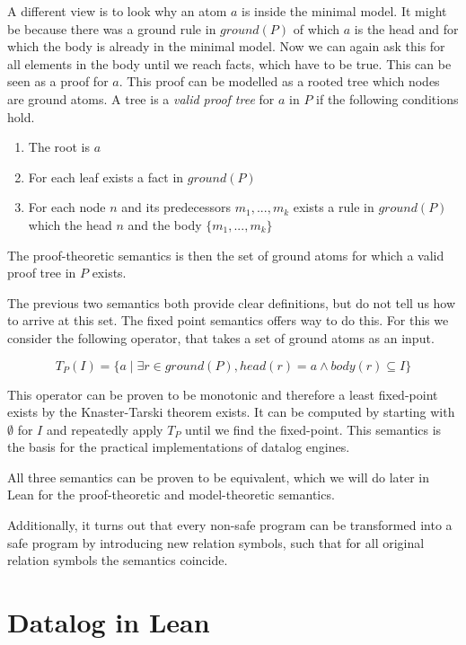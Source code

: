 \documentclass{article}
\begin{document}
        A different view is to look why an atom $a$ is inside the minimal model. It might be because there was a ground rule in $ground(P)$ of which $a$ is the head and for which the body is already in the minimal model. Now we can again ask this for all elements in the body until we reach facts, which have to be true. This can be seen as a proof for $a$. This proof can be modelled as a rooted tree which nodes are ground atoms. A tree is a \textit{valid proof tree} for $a$ in $P$ if the following conditions hold.
        \begin{enumerate}
            \item The root is $a$
            \item For each leaf exists a fact in $ground(P)$
            \item For each node $n$ and its predecessors $m_1,..., m_k$ exists a rule in $ground(P)$ which the head $n$ and the body $\{ m_1,..., m_k\}$
        \end{enumerate}
        The proof-theoretic semantics is then the set of ground atoms for which a valid proof tree in $P$ exists.

        The previous two semantics both provide clear definitions, but do not tell us how to arrive at this set. The fixed point semantics offers way to do this. For this we consider the following operator, that takes a set of ground atoms as an input.
        
        \[T_P(I) = \{a \mid \exists r \in ground(P), head(r) = a \land body(r) \subseteq I\}\]

        This operator can be proven to be monotonic and therefore a least fixed-point exists by the Knaster-Tarski theorem exists. It can be computed by starting with $\emptyset$ for $I$ and repeatedly apply $T_P$ until we find the fixed-point. This semantics is the basis for the practical implementations of datalog engines.

        All three semantics can be proven to be equivalent, which we will do later in Lean for the proof-theoretic and model-theoretic semantics.

        Additionally, it turns out that every non-safe program can be transformed into a safe program by introducing new relation symbols, such that for all original relation symbols the semantics coincide.
    \section{Datalog in Lean}
        
\end{document}
